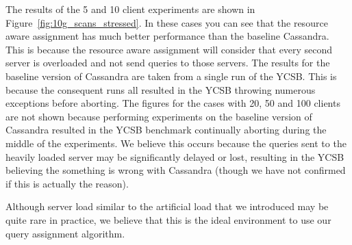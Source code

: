 The results of the 5 and 10 client experiments are shown in Figure~\ref{fig:10g_scans_stressed}. In these cases you can see that the resource aware assignment has much better performance than the baseline Cassandra. This is because the resource aware assignment will consider that every second server is overloaded and not send queries to those servers. The results for the baseline version of Cassandra are taken from a single run of the YCSB. This is because the consequent runs all resulted in the YCSB throwing numerous exceptions before aborting. The figures for the cases with 20, 50 and 100 clients are not shown because performing experiments on the baseline version of Cassandra resulted in the YCSB benchmark continually aborting during the middle of the experiments. We believe this occurs because the queries sent to the heavily loaded server may be significantly delayed or lost, resulting in the YCSB believing the something is wrong with Cassandra (though we have not confirmed if this is actually the reason).

Although server load similar to the artificial load that we introduced may be quite rare in practice, we believe that this is the ideal environment to use our query assignment algorithm.